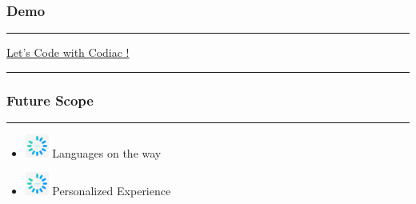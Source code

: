 \documentclass[14pt]{beamer}
\begin{document}
\begin{frame}
     \frametitle{Demo}
       {\color{dr} \rule{\linewidth}{0.7mm}}
       \linebreak
        \linebreak
        \centerline
        {\huge \color{dr}
        \href{https://codiac-codenow.herokuapp.com}{Let's Code with Codiac !}}
        \linebreak
     {\color{dr} \rule{\linewidth}{0.7mm}}
  \end{frame}


\begin{frame}
    \frametitle{Future Scope}
	\noindent
    {\color{pink} \rule{\linewidth}{0.7mm}} 
         \begin{itemize}
 \item [] \includegraphics[width=0.3in, height=0.3in]{./Codiac/logos/loading.jpg} Languages on the way\\
     \pause
 \item [] \includegraphics[width=0.3in, height=0.3in]{./Codiac/logos/loading.jpg} Personalized Experience \\
 \end{itemize}
\noindent{	
	   \color{pink} \rule{\linewidth}{0.7mm} }   	
\end{frame}	
\end{document}
